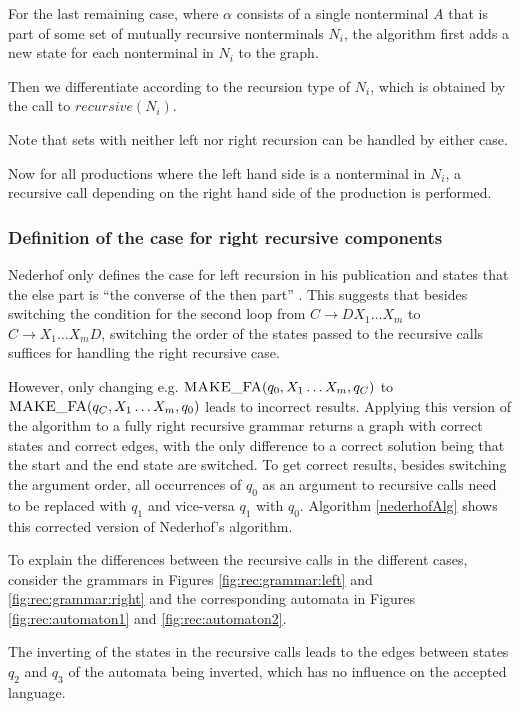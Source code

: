 For the last remaining case, where $\alpha$ consists of a single nonterminal $A$ that is part of some set of mutually recursive nonterminals $N_i$, the algorithm first adds a new state for each nonterminal in $N_i$ to the graph.

Then we differentiate according to the recursion type of $N_i$, which is obtained by the call to $recursive(N_i)$.

Note that sets with neither left nor right recursion can be handled by either case.

Now for all productions where the left hand side is a nonterminal in $N_i$, a recursive call depending on the right hand side of the production is performed. 

\subsubsection{Definition of the case for right recursive components}

Nederhof only defines the case for left recursion in his publication and states that the else part is \enquote{the converse of the then part} \cite{nederhof}. This suggests that besides switching the condition for the second loop from $C \rightarrow DX_1 \ldots X_m$ to  $C \rightarrow X_1 \ldots X_mD$, switching the order of the states passed to the recursive calls suffices for handling the right recursive case.

However, only changing e.g. $\textproc{MAKE\_FA}(q_0, X_1 \ldots X_m, q_C)$ to $\textproc{MAKE\_FA}(q_C, X_1 \ldots X_m, q_0)$ leads to incorrect results. Applying this version of the algorithm to a fully right recursive grammar returns a graph with correct states and correct edges, with the only difference to a correct solution being that the start and the end state are switched. To get correct results, besides switching the argument order, all occurrences of $q_0$ as an argument to recursive calls need to be replaced with $q_1$ and vice-versa $q_1$ with $q_0$. Algorithm \ref{nederhofAlg} shows this corrected version of Nederhof's algorithm.

To explain the differences between the recursive calls in the different cases, consider the grammars in Figures \ref{fig:rec:grammar:left} and \ref{fig:rec:grammar:right} and the corresponding automata in Figures \ref{fig:rec:automaton1} and \ref{fig:rec:automaton2}.

The inverting of the states in the recursive calls leads to the edges between states $q_2$ and $q_3$ of the automata being inverted, which has no influence on the accepted language. 

